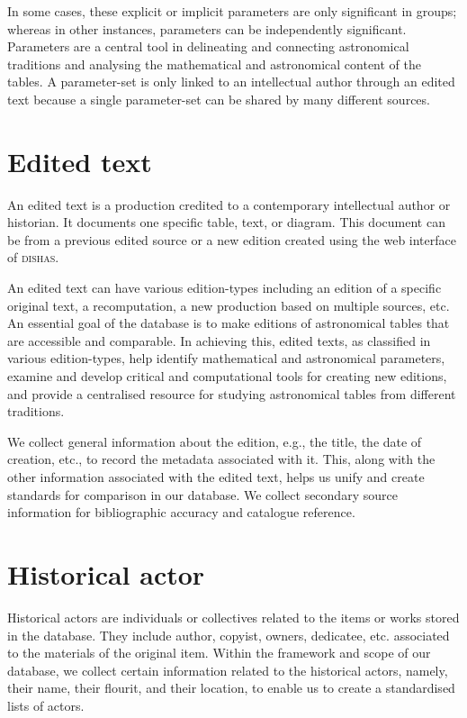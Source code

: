 \documentclass[a4paper,12pt,twoside]{book}
\begin{document}
	In some cases, these explicit or implicit parameters are only significant in groups; whereas in other instances, parameters can be independently significant. Parameters are a central tool in delineating and connecting astronomical traditions and analysing the mathematical and astronomical content of the tables.
	A parameter-set is only linked to an intellectual author through an edited text because a single parameter-set can be shared by many different sources.
	
		\section{Edited text}
	An edited text is a production credited to a contemporary intellectual author or historian. It documents one specific table, text, or diagram. This document can be from a previous edited source or a new edition created using the web interface of \textsc{dishas}.
	
	An edited text can have various edition-types including an edition of a specific original text, a recomputation, a new production based on multiple sources, etc. An essential goal of the database is to make editions of astronomical tables that are accessible and comparable. In achieving this, edited texts, as classified in various edition-types, help identify mathematical and astronomical parameters, examine and develop critical and computational tools for creating new editions, and provide a centralised resource for studying astronomical tables from different traditions.
	
	We collect general information about the edition, e.g., the title, the date of creation, etc., to record the metadata associated with it. This, along with the other information associated with the edited text, helps us unify and create standards for comparison in our database. We collect secondary source information for bibliographic accuracy and catalogue reference.
	
		\section{Historical actor}
	Historical actors are individuals or collectives related to the items or works stored in the database. They include author, copyist, owners, dedicatee, etc. associated to the materials of the original item. Within the framework and scope of our database, we collect certain information related to the historical actors, namely, their name, their flourit, and their location, to enable us to create a standardised lists of actors.
	
\end{document}
